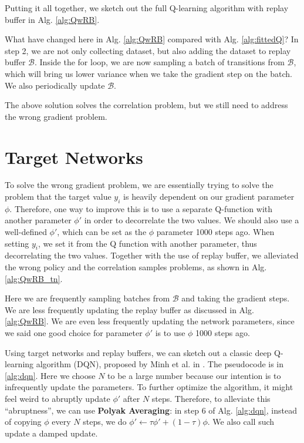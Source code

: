 Putting it all together, we sketch out the full Q-learning algorithm with replay buffer in Alg. \ref{alg:QwRB}.

What have changed here in Alg. \ref{alg:QwRB} compared with Alg. \ref{alg:fittedQ}? In step 2, we are not only collecting dataset, but also adding the dataset to replay buffer $\mathcal{B}$. Inside the for loop, we are now sampling a batch of transitions from $\mathcal{B}$, which will bring us lower variance when we take the gradient step on the batch. We also periodically update $\mathcal{B}$.

The above solution solves the correlation problem, but we still need to address the wrong gradient problem. 

\section{Target Networks}
To solve the wrong gradient problem, we are essentially trying to solve the problem that the target value $y_i$ is heavily dependent on our gradient parameter $\phi$. Therefore, one way to improve this is to use a separate Q-function with another parameter $\phi'$ in order to decorrelate the two values. We should also use a well-defined $\phi'$, which can be set as the $\phi$ parameter 1000 steps ago. When setting $y_i$, we set it from the Q function with another parameter, thus decorrelating the two values. Together with the use of replay buffer, we alleviated the wrong policy and the correlation samples problems, as shown in Alg. \ref{alg:QwRB_tn}.

Here we are frequently sampling batches from $\mathcal{B}$ and taking the gradient steps. We are less frequently updating the replay buffer as discussed in Alg. \ref{alg:QwRB}. We are even less frequently updating the network parameters, since we said one good choice for parameter $\phi'$ is to use $\phi$ 1000 steps ago.

Using target networks and replay buffers, we can sketch out a classic deep Q-learning algorithm (DQN), proposed by Minh et al. in \cite{mnih2013playing}. The pseudocode is in \ref{alg:dqn}. Here we choose $N$ to be a large number because our intention is to infrequently update the parameters. To further optimize the algorithm, it might feel weird to abruptly update $\phi'$ after $N$ steps. Therefore, to alleviate this ``abruptness'', we can use \textbf{Polyak Averaging}: in step 6 of Alg. \ref{alg:dqn}, instead of copying $\phi$ every $N$ steps, we do $\phi' \leftarrow \tau\phi' + (1-\tau)\phi$. We also call such update a damped update.


